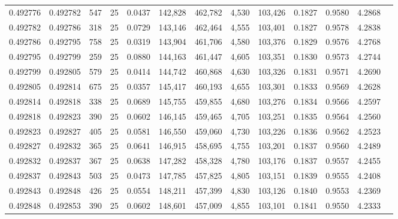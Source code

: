 \begin{tabular}{rrrrrrrrrrrrr}
0.492776 & 0.492782 &   547 &  25 &                                     0.0437 & 142,828 & 462,782 &   4,530 & 103,426 & 0.1827 & 0.9580 & 4.2868 \\
0.492782 & 0.492786 &   318 &  25 &                                     0.0729 & 143,146 & 462,464 &   4,555 & 103,401 & 0.1827 & 0.9578 & 4.2838 \\
0.492786 & 0.492795 &   758 &  25 &                                     0.0319 & 143,904 & 461,706 &   4,580 & 103,376 & 0.1829 & 0.9576 & 4.2768 \\
0.492795 & 0.492799 &   259 &  25 &                                     0.0880 & 144,163 & 461,447 &   4,605 & 103,351 & 0.1830 & 0.9573 & 4.2744 \\
0.492799 & 0.492805 &   579 &  25 &                                     0.0414 & 144,742 & 460,868 &   4,630 & 103,326 & 0.1831 & 0.9571 & 4.2690 \\
0.492805 & 0.492814 &   675 &  25 &                                     0.0357 & 145,417 & 460,193 &   4,655 & 103,301 & 0.1833 & 0.9569 & 4.2628 \\
0.492814 & 0.492818 &   338 &  25 &                                     0.0689 & 145,755 & 459,855 &   4,680 & 103,276 & 0.1834 & 0.9566 & 4.2597 \\
0.492818 & 0.492823 &   390 &  25 &                                     0.0602 & 146,145 & 459,465 &   4,705 & 103,251 & 0.1835 & 0.9564 & 4.2560 \\
0.492823 & 0.492827 &   405 &  25 &                                     0.0581 & 146,550 & 459,060 &   4,730 & 103,226 & 0.1836 & 0.9562 & 4.2523 \\
0.492827 & 0.492832 &   365 &  25 &                                     0.0641 & 146,915 & 458,695 &   4,755 & 103,201 & 0.1837 & 0.9560 & 4.2489 \\
0.492832 & 0.492837 &   367 &  25 &                                     0.0638 & 147,282 & 458,328 &   4,780 & 103,176 & 0.1837 & 0.9557 & 4.2455 \\
0.492837 & 0.492843 &   503 &  25 &                                     0.0473 & 147,785 & 457,825 &   4,805 & 103,151 & 0.1839 & 0.9555 & 4.2408 \\
0.492843 & 0.492848 &   426 &  25 &                                     0.0554 & 148,211 & 457,399 &   4,830 & 103,126 & 0.1840 & 0.9553 & 4.2369 \\
0.492848 & 0.492853 &   390 &  25 &                                     0.0602 & 148,601 & 457,009 &   4,855 & 103,101 & 0.1841 & 0.9550 & 4.2333 \\

\end{tabular}
